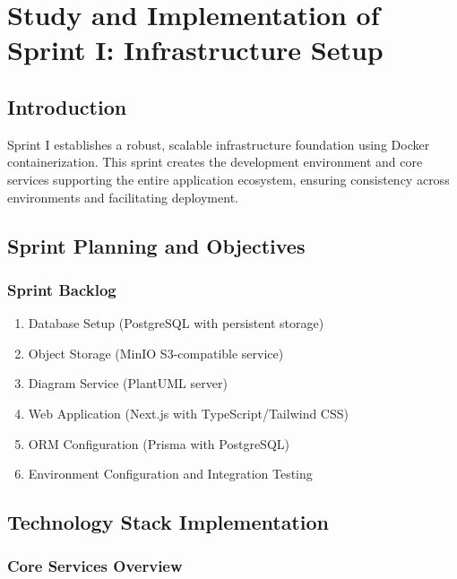 \chapter[Sprint I]{Study and Implementation of Sprint I: Infrastructure Setup}

\section{Introduction}

Sprint I establishes a robust, scalable infrastructure foundation using  Docker containerization. This sprint creates the development environment and core services supporting the entire application ecosystem, ensuring consistency across environments and facilitating deployment.

\section{Sprint Planning and Objectives}

\subsection{Sprint Backlog}
\begin{enumerate}
    \item Database Setup (PostgreSQL with persistent storage)
    \item Object Storage (MinIO S3-compatible service)
    \item Diagram Service (PlantUML server)
    \item Web Application (Next.js with TypeScript/Tailwind CSS)
    \item ORM Configuration (Prisma with PostgreSQL)

    \item Environment Configuration and Integration Testing
\end{enumerate}

\section{Technology Stack Implementation}

\subsection{Core Services Overview}

